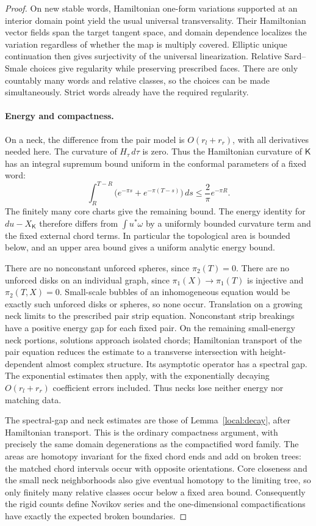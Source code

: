 \begin{proof}
On new stable words, Hamiltonian one-form variations supported at an
interior domain point yield the usual universal transversality.
Their Hamiltonian vector fields span the target tangent space, and
domain dependence localizes the variation regardless of whether the
map is multiply covered.  Elliptic unique continuation then gives
surjectivity of the universal linearization.  Relative Sard--Smale
choices give regularity while preserving prescribed faces.  There are
only countably many words and relative classes, so the choices can
be made simultaneously.  Strict words already have the required
regularity.

\paragraph{Energy and compactness.}
On a neck, the difference from the pair model is
\(O(r_l+r_r)\), with all derivatives needed here.  The curvature of
\(H_\tau\,d\tau\) is zero.  Thus the Hamiltonian curvature of
\(\mathsf K\) has an integral supremum bound uniform in the conformal
parameters of a fixed word:
\[
 \int_R^{T-R}\bigl(e^{-\pi s}+e^{-\pi(T-s)}\bigr)\,ds
 \le \frac{2}{\pi}e^{-\pi R}.
\]
The finitely many core charts give the remaining bound.  The energy
identity for \(du-X_{\mathsf K}\) therefore differs from
\(\int u^*\omega\) by a uniformly bounded curvature term and the fixed
external chord terms.  In particular the topological area is bounded
below, and an upper area bound gives a uniform analytic energy bound.

There are no nonconstant unforced spheres, since \(\pi_2(T)=0\).
There are no unforced disks on an individual graph, since
\(\pi_1(X)\to\pi_1(T)\) is injective and
\(\pi_2(T,X)=0\).  Small-scale bubbles of an inhomogeneous equation would
be exactly such unforced disks or spheres, so none occur.
Translation on a growing neck limits to the prescribed pair strip
equation.  Nonconstant strip breakings have a positive energy gap for
each fixed pair.  On the remaining small-energy neck portions,
solutions approach isolated chords; Hamiltonian transport of the pair
equation reduces the estimate to a transverse intersection with
height-dependent almost complex structure.  Its asymptotic operator
has a spectral gap.  The exponential estimates then apply, with the
exponentially decaying \(O(r_l+r_r)\) coefficient errors included.
Thus necks lose neither energy nor matching data.

The spectral-gap and neck estimates are those of
Lemma~\ref{local:decay}, after Hamiltonian transport.
This is the ordinary compactness argument, with precisely the same
domain degenerations as the compactified word family.  The areas are
homotopy invariant for the fixed chord ends and add on broken trees:
the matched chord intervals occur with opposite orientations.  Core
closeness and the small neck neighborhoods also give eventual homotopy
to the limiting tree, so only finitely many relative classes occur
below a fixed area bound.  Consequently the rigid counts define
Novikov series and the one-dimensional compactifications have exactly
the expected broken boundaries.


\end{proof}
